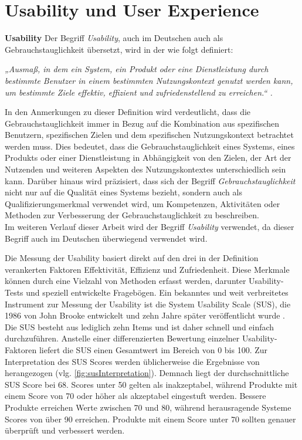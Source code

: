 \section{Usability und User Experience}

\textbf{Usability}
Der Begriff \textit{Usability}, auch im Deutschen auch als Gebrauchstauglichkeit übersetzt, wird in der \citet{DINISO9241-11} wie folgt definiert:


\textit{„Ausmaß, in dem ein System, ein Produkt oder eine Dienstleistung durch bestimmte Benutzer in einem bestimmten Nutzungskontext genutzt werden kann, um bestimmte Ziele effektiv, effizient und zufriedenstellend zu erreichen.“ \cite{DINISO9241-11}.}

In den Anmerkungen zu dieser Definition wird verdeutlicht, dass die Gebrauchstauglichkeit immer in Bezug auf die Kombination aus spezifischen Benutzern, spezifischen Zielen und dem spezifischen Nutzungskontext betrachtet werden muss. Dies bedeutet, dass die Gebrauchstauglichkeit eines Systems, eines Produkts oder einer Dienstleistung in Abhängigkeit von den Zielen, der Art der Nutzenden und weiteren Aspekten des Nutzungskontextes unterschiedlich sein kann. Darüber hinaus wird präzisiert, dass sich der Begriff \textit{Gebrauchstauglichkeit} nicht nur auf die Qualität eines Systems bezieht, sondern auch als Qualifizierungsmerkmal verwendet wird, um Kompetenzen, Aktivitäten oder Methoden zur Verbesserung der Gebrauchstauglichkeit zu beschreiben. \\
Im weiteren Verlauf dieser Arbeit wird der Begriff \textit{Usability} verwendet, da dieser Begriff auch im Deutschen überwiegend verwendet wird. 

Die Messung der Usability basiert direkt auf den drei in der Definition verankerten Faktoren Effektivität, Effizienz und Zufriedenheit. Diese Merkmale können durch eine Vielzahl von Methoden erfasst werden, darunter Usability-Tests und speziell entwickelte Fragebögen. Ein bekanntes und weit verbreitetes Instrument zur Messung der Usability ist die System Usability Scale (SUS), die 1986 von John Brooke entwickelt und zehn Jahre später veröffentlicht wurde \citep{brooke_sus_1996}.\\
Die SUS besteht aus lediglich zehn Items und ist daher schnell und einfach durchzuführen. Anstelle einer differenzierten Bewertung einzelner Usability-Faktoren liefert die SUS einen Gesamtwert im Bereich von 0 bis 100. Zur Interpretation des SUS Scores werden üblicherweise die Ergebnisse von \citet{bangor_empirical_2008} herangezogen (vlg. \autoref{fig:susInterpretation}). Demnach liegt der durchschnittliche SUS Score bei 68. Scores unter 50 gelten als inakzeptabel, während Produkte mit einem Score von 70 oder höher als akzeptabel eingestuft werden. Bessere Produkte erreichen Werte zwischen 70 und 80, während herausragende Systeme Scores von über 90 erreichen. Produkte mit einem Score unter 70 sollten genauer überprüft und verbessert werden. 

